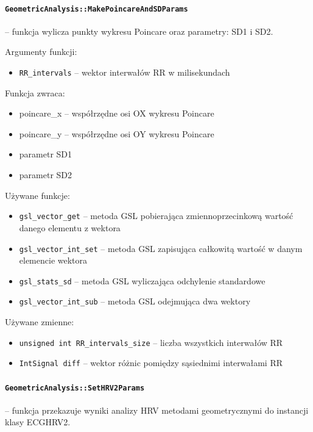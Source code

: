 \documentclass[a4paper, 11pt]{article}
\begin{document}
\paragraph{\texttt{GeometricAnalysis::MakePoincareAndSDParams}} -- funkcja wylicza punkty wykresu Poincare oraz parametry: SD1 i SD2.

\medskip{}


Argumenty funkcji:
\begin{itemize}
\item \verb+RR_intervals+ -- wektor interwałów RR w milisekundach
\end{itemize}
\medskip{}


Funkcja zwraca:
\begin{itemize}
\item poincare\_x -- współrzędne osi OX wykresu Poincare
\item poincare\_y -- współrzędne osi OY wykresu Poincare
\item parametr SD1
\item parametr SD2
\end{itemize}
\medskip{}


Używane funkcje:
\begin{itemize}
\item \verb+gsl_vector_get+ -- metoda GSL pobierająca zmiennoprzecinkową wartość
danego elementu z wektora
\item \verb+gsl_vector_int_set+ -- metoda GSL zapisująca całkowitą wartość w
danym elemencie wektora
\item \verb+gsl_stats_sd+ -- metoda GSL wyliczająca odchylenie standardowe
\item \verb+gsl_vector_int_sub+ -- metoda GSL odejmująca dwa wektory
\end{itemize}
\medskip{}


Używane zmienne:
\begin{itemize}
\item \verb+unsigned int RR_intervals_size+ -- liczba wszystkich interwałów RR
\item \verb+IntSignal diff+ -- wektor różnic pomiędzy sąsiednimi interwałami RR
\end{itemize}
%

\paragraph{\texttt{GeometricAnalysis::SetHRV2Params}} -- funkcja przekazuje wyniki analizy HRV metodami geometrycznymi do instancji
klasy ECGHRV2.
\end{document}
